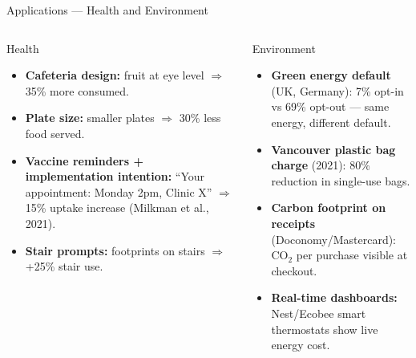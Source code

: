 \documentclass[aspectratio=169]{beamer}
\begin{document}
\begin{frame}{Applications --- Health and Environment}
\begin{columns}
\begin{block}{Health}
\begin{itemize}
  \item \textbf{Cafeteria design:} fruit at eye level $\Rightarrow$ 35\% more consumed.
  \item \textbf{Plate size:} smaller plates $\Rightarrow$ 30\% less food served.
  \item \textbf{Vaccine reminders + implementation intention:} ``Your appointment: Monday 2pm, Clinic X'' $\Rightarrow$ 15\% uptake increase (Milkman et al., 2021).
  \item \textbf{Stair prompts:} footprints on stairs $\Rightarrow$ +25\% stair use.
\end{itemize}
\end{block}
\begin{block}{Environment}
\begin{itemize}
  \item \textbf{Green energy default} (UK, Germany): 7\% opt-in vs 69\% opt-out --- same energy, different default.
  \item \textbf{Vancouver plastic bag charge} (2021): 80\% reduction in single-use bags.
  \item \textbf{Carbon footprint on receipts} (Doconomy/Mastercard): CO$_2$ per purchase visible at checkout.
  \item \textbf{Real-time dashboards:} Nest/Ecobee smart thermostats show live energy cost.
\end{itemize}
\end{block}
\end{columns}
\end{frame}
\end{document}
